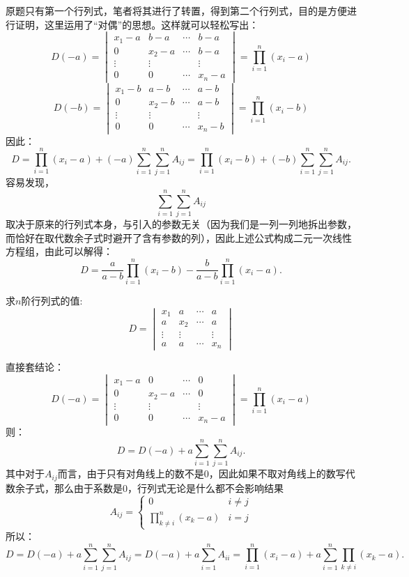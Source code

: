 \begin{solution}{}{}
    原题只有第一个行列式，笔者将其进行了转置，得到第二个行列式，目的是方便进行证明，这里运用了“对偶”的思想。这样就可以轻松写出：
    \[D(-a)=\begin{vmatrix}x_1-a&b-a&\cdots&b-a\\0&x_2-a&\cdots&b-a\\
        \vdots&\vdots&&\vdots\\0&0&\cdots&x_n-a\end{vmatrix}=\prod_{i=1}^n(x_i-a)\]
    \[D(-b)=\begin{vmatrix}x_1-b&a-b&\cdots&a-b\\0&x_2-b&\cdots&a-b\\
        \vdots&\vdots&&\vdots\\0&0&\cdots&x_n-b\end{vmatrix}=\prod_{i=1}^n(x_i-b)\]
    因此：\[D=\prod_{i=1}^n(x_i-a)+(-a)\sum_{i=1}^n\sum_{j=1}^nA_{ij}=\prod_{i=1}^n(x_i-b)+(-b)\sum_{i=1}^n\sum_{j=1}^nA_{ij}.\]
    容易发现，\[\sum_{i=1}^n\sum_{j=1}^nA_{ij}\]取决于原来的行列式本身，与引入的参数无关（因为我们是一列一列地拆出参数，而恰好在取代数余子式时避开了含有参数的列），因此上述公式构成二元一次线性方程组，由此可以解得：
    \[D=\frac{a}{a-b}\prod_{i=1}^{n}(x_{i}-b)-\frac{b}{a-b}\prod_{i=1}^{n}(x_{i}-a).\]
\end{solution}
\begin{example}{}{}
    求$n$阶行列式的值:
        \[D=\begin{vmatrix}x_1&a&\cdots&a\\a&x_2&\cdots&a\\
        \vdots&\vdots&&\vdots\\a&a&\cdots&x_n\end{vmatrix}\]
\end{example}
\begin{solution}{}{}
    直接套结论：
    \[D(-a)=\begin{vmatrix}x_1-a&0&\cdots&0\\0&x_2-a&\cdots&0\\
        \vdots&\vdots&&\vdots\\0&0&\cdots&x_n-a\end{vmatrix}=\prod_{i=1}^n(x_i-a)\]
    则：\[D=D(-a)+a\sum_{i=1}^n\sum_{j=1}^nA_{ij}.\]
    其中对于$A_{ij}$而言，由于只有对角线上的数不是0，因此如果不取对角线上的数写代数余子式，那么由于系数是0，行列式无论是什么都不会影响结果\[
    A_{ij} = \begin{cases} 
    0 & i \neq j \\
    \prod\limits_{k \neq i}^{n} (x_k - a) & i = j \end{cases}\]
    所以：\[
    D=D(-a)+a\sum_{i=1}^n\sum_{j=1}^nA_{ij}=D(-a)+a\sum_{i=1}^nA_{ii}=\prod_{i=1}^n(x_i-a)+a\sum_{i=1}^n\prod_{k\neq i}(x_k-a).
    \]
\end{solution}
